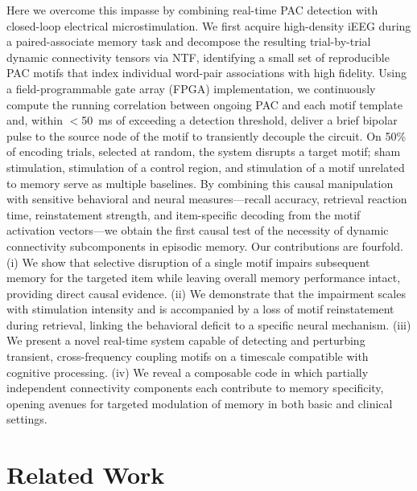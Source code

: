 \documentclass{article}
\begin{document}
Here we overcome this impasse by combining real-time PAC detection with closed-loop electrical microstimulation. We first acquire high-density iEEG during a paired-associate memory task and decompose the resulting trial-by-trial dynamic connectivity tensors via NTF, identifying a small set of reproducible PAC motifs that index individual word-pair associations with high fidelity. Using a field-programmable gate array (FPGA) implementation, we continuously compute the running correlation between ongoing PAC and each motif template and, within $<$50~ms of exceeding a detection threshold, deliver a brief bipolar pulse to the source node of the motif to transiently decouple the circuit. On 50\% of encoding trials, selected at random, the system disrupts a target motif; sham stimulation, stimulation of a control region, and stimulation of a motif unrelated to memory serve as multiple baselines. By combining this causal manipulation with sensitive behavioral and neural measures—recall accuracy, retrieval reaction time, reinstatement strength, and item-specific decoding from the motif activation vectors—we obtain the first causal test of the necessity of dynamic connectivity subcomponents in episodic memory. Our contributions are fourfold. (i) We show that selective disruption of a single motif impairs subsequent memory for the targeted item while leaving overall memory performance intact, providing direct causal evidence. (ii) We demonstrate that the impairment scales with stimulation intensity and is accompanied by a loss of motif reinstatement during retrieval, linking the behavioral deficit to a specific neural mechanism. (iii) We present a novel real-time system capable of detecting and perturbing transient, cross-frequency coupling motifs on a timescale compatible with cognitive processing. (iv) We reveal a composable code in which partially independent connectivity components each contribute to memory specificity, opening avenues for targeted modulation of memory in both basic and clinical settings.

\section{Related Work}
\end{document}

